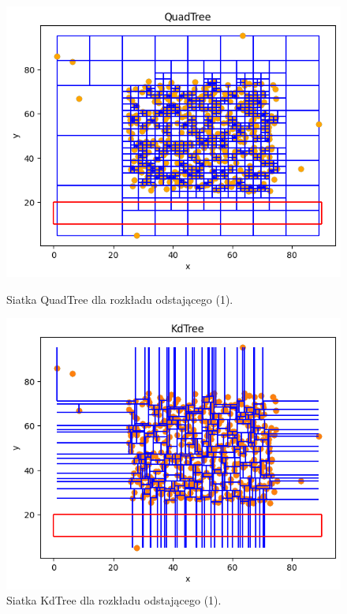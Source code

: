 \documentclass{lab}
\begin{document}
\begin{figure}[H]
  \centering
  \begin{minipage}{0.495\textwidth}
      \centering
      \includegraphics[width=1\textwidth]{resources/outlier_QuadTree_1.png}
      \caption{Siatka QuadTree dla rozkładu odstającego (1).}
      \label{fig:outlier_QuadTree_1}
  \end{minipage}
  \begin{minipage}{0.495\textwidth}
      \centering
      \includegraphics[width=1\textwidth]{resources/outlier_KdTree_1.png}
      \caption{Siatka KdTree dla rozkładu odstającego  (1).}
      \label{fig:outlier_KdTree_1}
  \end{minipage}
\end{figure}
\end{document}
